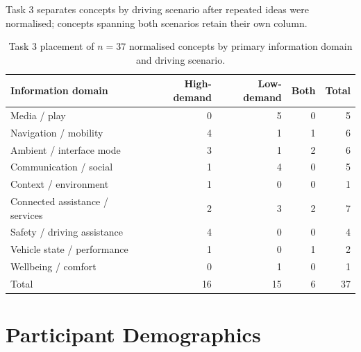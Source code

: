 \documentclass[
english,                 %
bibtex,                  %
includeExtraAbstracts, %
]{kththesis}
\newenvironment{evidenceblock}{\par\addvspace{6pt}\noindent\begin{minipage}{\linewidth}}{\end{minipage}\par\addvspace{6pt}}
\numberwithin{listing}{chapter}
\begin{document}
\begin{evidenceblock}
\normalsize
Task 3 separates concepts by driving scenario after repeated ideas were normalised; concepts spanning both scenarios retain their own column.

\begin{table}[H]
\centering
\scriptsize
\caption[Task 3 concepts by domain and scenario]{Task 3 placement of $n = 37$ normalised concepts by primary information domain and driving scenario.}
\label{tab:workshop-t3-scenarios}
\begin{tabularx}{\textwidth}{@{}>{\raggedright\arraybackslash}Xrrrr@{}}
\toprule
Information domain & High-demand & Low-demand & Both & Total \\
\midrule
Media / play & 0 & 5 & 0 & 5 \\
Navigation / mobility & 4 & 1 & 1 & 6 \\
Ambient / interface mode & 3 & 1 & 2 & 6 \\
Communication / social & 1 & 4 & 0 & 5 \\
Context / environment & 1 & 0 & 0 & 1 \\
Connected assistance / services & 2 & 3 & 2 & 7 \\
Safety / driving assistance & 4 & 0 & 0 & 4 \\
Vehicle state / performance & 1 & 0 & 1 & 2 \\
Wellbeing / comfort & 0 & 1 & 0 & 1 \\
\midrule
Total & 16 & 15 & 6 & 37 \\
\bottomrule
\end{tabularx}
\end{table}
\end{evidenceblock}
\section{Participant Demographics}
\label{app:demographic-tables}
\end{document}
